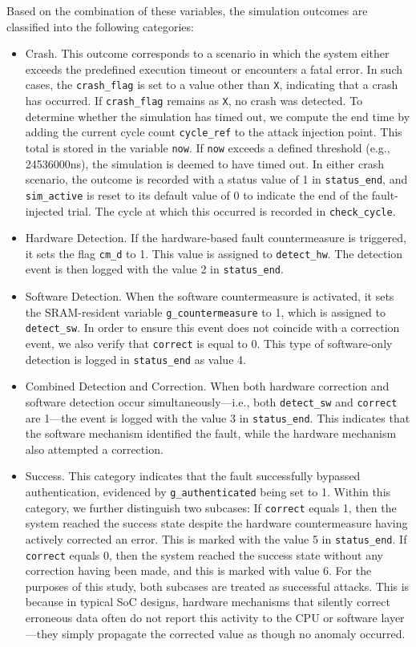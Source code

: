 Based on the combination of these variables, the simulation outcomes are classified into the following categories:
\begin{itemize}
\item Crash. This outcome corresponds to a scenario in which the system either exceeds the predefined execution timeout or encounters a fatal error. In such cases, the \texttt{crash\_flag} is set to a value other than \texttt{X}, indicating that a crash has occurred. If \texttt{crash\_flag} remains as \texttt{X}, no crash was detected. To determine whether the simulation has timed out, we compute the end time by adding the current cycle count \texttt{cycle\_ref} to the attack injection point. This total is stored in the variable \texttt{now}. If \texttt{now} exceeds a defined threshold (e.g., 24536000ns), the simulation is deemed to have timed out. In either crash scenario, the outcome is recorded with a status value of 1 in \texttt{status\_end}, and \texttt{sim\_active} is reset to its default value of 0 to indicate the end of the fault-injected trial. The cycle at which this occurred is recorded in \texttt{check\_cycle}.

\item Hardware Detection. If the hardware-based fault countermeasure is triggered, it sets the flag \texttt{cm\_d} to 1. This value is assigned to \texttt{detect\_hw}. The detection event is then logged with the value 2 in \texttt{status\_end}.

\item Software Detection. When the software countermeasure is activated, it sets the SRAM-resident variable \texttt{g\_countermeasure} to 1, which is assigned to \texttt{detect\_sw}. In order to ensure this event does not coincide with a correction event, we also verify that \texttt{correct} is equal to 0. This type of software-only detection is logged in \texttt{status\_end} as value 4.

\item Combined Detection and Correction. When both hardware correction and software detection occur simultaneously—i.e., both \texttt{detect\_sw} and \texttt{correct} are 1—the event is logged with the value 3 in \texttt{status\_end}. This indicates that the software mechanism identified the fault, while the hardware mechanism also attempted a correction.

\item Success. This category indicates that the fault successfully bypassed authentication, evidenced by \texttt{g\_authenticated} being set to 1. Within this category, we further distinguish two subcases: If \texttt{correct} equals 1, then the system reached the success state despite the hardware countermeasure having actively corrected an error. This is marked with the value 5 in \texttt{status\_end}. If \texttt{correct} equals 0, then the system reached the success state without any correction having been made, and this is marked with value 6. For the purposes of this study, both subcases are treated as successful attacks. This is because in typical SoC designs, hardware mechanisms that silently correct erroneous data often do not report this activity to the CPU or software layer—they simply propagate the corrected value as though no anomaly occurred.


\end{itemize}
